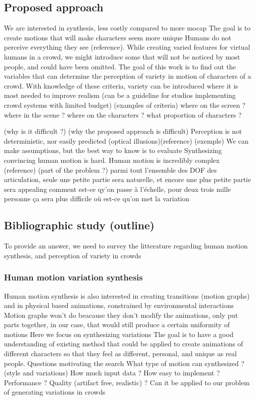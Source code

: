 \documentclass[11pt]{sdm_internship}
\begin{document}
\subsection{Proposed approach}
We are interested in synthesis, less costly compared to more mocap
The goal is to create motions that will make characters seem more unique
Humans do not perceive everything they see (reference). 
While creating varied features for virtual humans in a crowd, we might introduce some that will not be noticed by most people, and could have been omitted.
The goal of this work is to find out the variables that can determine the perception of variety in motion of characters of a crowd.
With knowledge of these criteria, variety can be introduced where it is most needed to improve realism
(can be a guideline for studios implementing crowd systems with limited budget)
(examples of criteria)
where on the screen ? where in the scene ? where on the characters ? what proportion of characters ?

(why is it difficult ?) 
(why the proposed approach is difficult)
Perception is not deterministic, nor easily predicted (optical illusions)(reference)
(exemple)
We can make assumptions, but the best way to know is to evaluate
Synthesizing convincing human motion is hard. Human motion is incredibly complex (reference) (part of the problem ?)
parmi tout l'ensemble des DOF des articulation, seule une petite partie sera naturelle, et encore une plus petite partie sera appealing
comment est-ce qy'on passe à l'échelle, pour deux trois mille personne ça sera plus difficile 
où est-ce qu'on met la variation 

\subsection{Bibliographic study (outline)}
To provide an answer, we need to survey the litterature regarding human motion synthesis, and perception of variety in crowds

\subsubsection{Human motion variation synthesis}
Human motion synthesis is also interested in creating transitions (motion graphs) and in physical based animations, constrained by environmental interactions
Motion graphs won't do beacause they don't modify the animations, only put parts together, in our case, that would still produce a certain uniformity of motions
Here we focus on synthesizing variations
The goal is to have a good understanding of existing method that could be applied to create animations of different characters so that they feel as different, personal, and unique as real people.
Questions motivating the search
What type of motion can synthesized ? (style and variations)
How much input data ? How easy to implement ? Performance ? Quality (artifact free, realistic) ? 
Can it be applied to our problem of generating variations in crowds 
\end{document}
